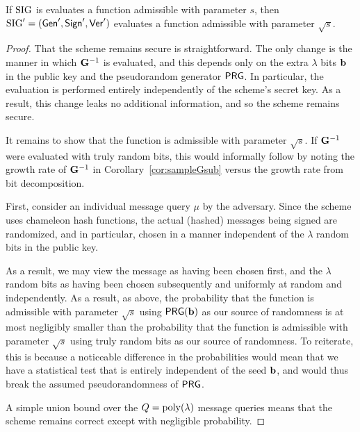 \begin{theorem}[Informal]\label{thm:ch-transform} If $\text{SIG}$ is evaluates a
  function admissible with parameter $s$, then
$\text{SIG}'=(\mathsf{Gen}',\mathsf{Sign}',\mathsf{Ver}')$ evaluates a function admissible
with parameter $\sqrt{s}$. 
\end{theorem}

\begin{proof}
  That the scheme remains secure is straightforward. The only change is the
  manner in which
  $\mathbf{G}^{-1}$ is evaluated, and this depends only on the extra $\lambda$ bits
  $\mathbf{b}$ in the public key and the pseudorandom generator
  $\mathsf{PRG}$. In particular, the evaluation is performed entirely
  independently of the scheme's secret key. As a result, this change
  leaks no additional information, and so the scheme remains secure. 

It remains to show that the function is admissible with parameter
$\sqrt{s}$. If $\mathbf{G}^{-1}$ were evaluated with truly random bits,
this would informally follow by noting
the growth rate of $\mathbf{G}^{-1}$ in Corollary~\ref{cor:sampleGsub}
versus the growth rate from bit decomposition.

 First, consider an individual message query $\mu$ by the
  adversary. Since the scheme uses chameleon hash functions, the
  actual (hashed) messages being signed are randomized, and in
  particular, chosen in a manner independent of the $\lambda$ random
  bits in the public key.

  As a result, we may view the message as having been chosen first,
  and the $\lambda$ random bits as having been chosen subsequently and
  uniformly at random and independently. As a result, as above, the
  probability that the function is admissible with parameter $\sqrt{s}$
  using $\mathsf{PRG}(\mathbf{b})$ as our source of randomness is at most
  negligibly smaller than the probability that the function is
  admissible with parameter $\sqrt{s}$ using truly random bits as our source of
  randomness. To reiterate, this is because a noticeable difference in
  the probabilities would mean that we have a statistical test that is
  entirely independent of the seed $\mathbf{b}$, and would thus break the assumed
  pseudorandomness of $\mathsf{PRG}$. 

  A simple union bound over the $Q=\operatorname{poly}(\lambda)$ message
  queries means that the scheme remains correct except with negligible
  probability.
\end{proof}



